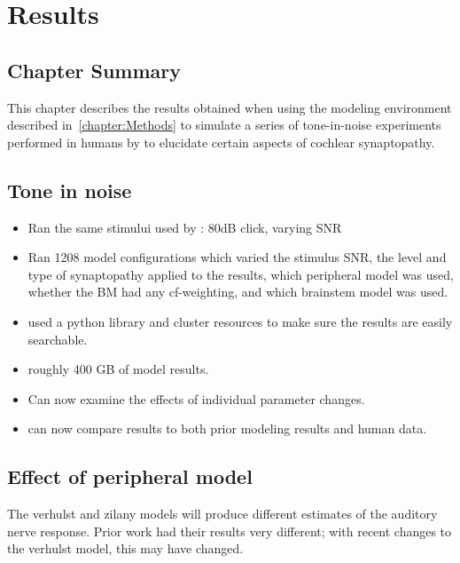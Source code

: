 \chapter{Results}
\label{chapter:Results}
\thispagestyle{myheadings}

\graphicspath{{5_Results/Figures/}}
\section{Chapter Summary} %
\label{sec:results_summary}
This chapter describes the results obtained when using the modeling environment described in~\autoref{chapter:Methods} to simulate a series of tone-in-noise experiments performed in humans by \citeauthor{Mehraei2016Auditory} to elucidate certain aspects of cochlear synaptopathy. 


\section{Tone in noise} %
\label{sec:tone_in_noise}

\begin{itemize}
	\item Ran the same stimului used by \cite{Mehraei2015Auditory}: 80dB click, varying SNR
	\item Ran 1208 model configurations which varied  the stimulus SNR, the level and type of synaptopathy applied to the results, which peripheral model was used, whether the BM had any cf-weighting, and which brainstem model was used. 
	\item used a python library and cluster resources to make sure the results are easily searchable. 
	\item roughly 400 GB of model results.
	\item Can now examine the effects of individual parameter changes. 
	\item can now compare results to both prior modeling results and human data. 
\end{itemize}
\section{Effect of peripheral model} %
\label{sec:effect_of_peripheral_model}
The verhulst and zilany models will produce different estimates of the auditory nerve response. Prior work had their results very different; with recent changes to the verhulst model, this may have changed.

